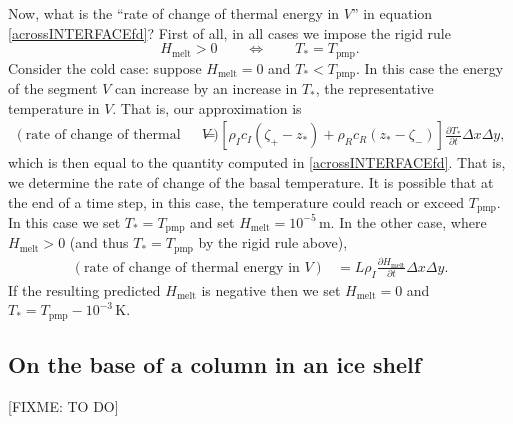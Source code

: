 \documentclass[12pt,final]{amsart}%
\theoremstyle{plain}
\theoremstyle{definition}
\theoremstyle{remark}
\newcommand{\ddt}[1]{\ensuremath{\frac{\partial #1}{\partial t}}}
\newcommand{\Tpmp}{T_{\text{pmp}}}
\begin{document}
Now, what is the ``rate of change of thermal energy in $V$'' in equation \eqref{acrossINTERFACEfd}?  First of all, in all cases we impose the rigid rule
    $$H_{\text{melt}} > 0 \qquad \iff \qquad T_\ast = \Tpmp.$$
Consider the cold case: suppose $H_{\text{melt}} = 0$ and $T_\ast < \Tpmp$.  In this case the energy of the segment $V$ can increase by an increase in $T_\ast$, the representative temperature in $V$.  That is, our approximation is
\begin{align*}
\left(\text{rate of change of thermal energy in }V\right) &= \left[\rho_I c_I (\zeta_+ - z_\ast) + \rho_R c_R (z_\ast - \zeta_-)\right] \ddt{T_\ast} \Delta x \Delta y,
\end{align*}
which is then equal to the quantity computed in \eqref{acrossINTERFACEfd}.  That is, we determine the rate of change of the basal temperature.  It is possible that at the end of a time step, in this case, the temperature could reach or exceed $\Tpmp$.  In this case we set $T_\ast=\Tpmp$ and set $H_{\text{melt}} = 10^{-5}\,\text{m}$.  In the other case, where $H_{\text{melt}} > 0$ (and thus $T_\ast = \Tpmp$ by the rigid rule above),
\begin{align*}
\left(\text{rate of change of thermal energy in }V\right) &= L \rho_I \ddt{H_{\text{melt}}} \Delta x \Delta y.
\end{align*}
If the resulting predicted $H_{\text{melt}}$ is negative then we set $H_{\text{melt}} = 0$ and $T_\ast=\Tpmp - 10^{-3}\,\text{K}$.



\subsection*{On the base of a column in an ice shelf}  [FIXME: TO DO]



\newpage


\end{document}
